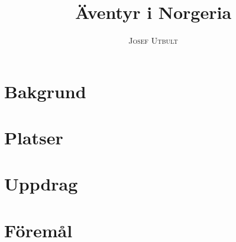 \documentclass[a4paper,11pt]{article}
\title{\Huge \textbf{Äventyr i Norgeria}}
\author{\textsc{Josef Utbult}}
\begin{document}
\maketitle
\newpage
\tableofcontents
\newpage
{}
%
\section{Bakgrund}

\newpage
%
\section{Platser}

\newpage
%
\section{Uppdrag}

%
\section{Föremål}

%
\newpage

\end{document}
